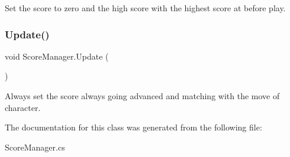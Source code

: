 Set the score to zero and the high score with the highest score at before play. 

\hypertarget{class_score_manager_a0d37ca647468e53d1735d8d185b7ee34}{}\label{class_score_manager_a0d37ca647468e53d1735d8d185b7ee34} 
\subsubsection{\texorpdfstring{Update()}{Update()}}
{\footnotesize\ttfamily void Score\+Manager.\+Update (\begin{DoxyParamCaption}{ }\end{DoxyParamCaption})\hspace{0.3cm}{\ttfamily [private]}}



Always set the score always going advanced and matching with the move of character. 



The documentation for this class was generated from the following file\+:\begin{DoxyCompactItemize}
\item 
Score\+Manager.\+cs\end{DoxyCompactItemize}

